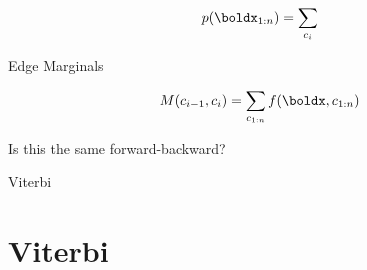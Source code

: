 \begin{frame}
  \[ p(\boldx_{1:n}) = \sum_{c_i}  \] 
\end{frame}


\begin{frame}{Edge Marginals}

  \[M(c_{i-1}, c_i) =  \sum_{c_{1:n}} f(\boldx, c_{1:n}) \] 
  

\end{frame}

\begin{frame}{}
  Is this the same forward-backward? 
\end{frame}


\begin{frame}{Viterbi}
  
  

\end{frame}



\section{Viterbi}
